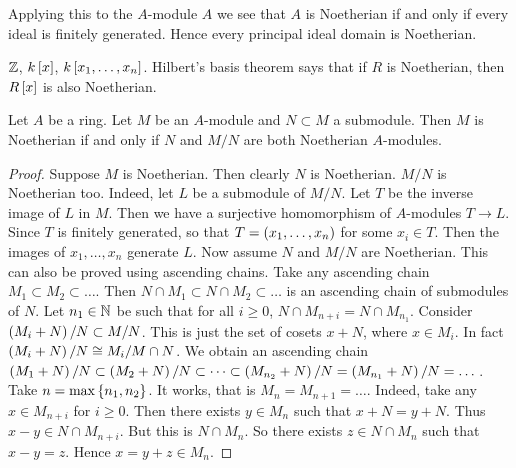 \begin{remark}
Applying this to the $ A $-module $ A $ we see that $ A $ is Noetherian if and only if every ideal is finitely generated. Hence every principal ideal domain is Noetherian.
\end{remark}

\begin{example*}
$ \Z $, $ k\sb{x} $, $ k\sb{x_1, \dots, x_n} $. Hilbert's basis theorem says that if $ R $ is Noetherian, then $ R\sb{x} $ is also Noetherian.
\end{example*}

\pagebreak

\begin{proposition}
\label{prop:10.4}
Let $ A $ be a ring. Let $ M $ be an $ A $-module and $ N \subset M $ a submodule. Then $ M $ is Noetherian if and only if $ N $ and $ M / N $ are both Noetherian $ A $-modules.
\end{proposition}

\begin{proof}
Suppose $ M $ is Noetherian. Then clearly $ N $ is Noetherian. $ M / N $ is Noetherian too. Indeed, let $ L $ be a submodule of $ M / N $. Let $ T $ be the inverse image of $ L $ in $ M $. Then we have a surjective homomorphism of $ A $-modules $ T \to L $. Since $ T $ is finitely generated, so that $ T = \rb{x_1, \dots, x_n} $ for some $ x_i \in T $. Then the images of $ x_1, \dots, x_n $ generate $ L $. Now assume $ N $ and $ M / N $ are Noetherian. This can also be proved using ascending chains. Take any ascending chain $ M_1 \subset M_2 \subset \dots $. Then $ N \cap M_1 \subset N \cap M_2 \subset \dots $ is an ascending chain of submodules of $ N $. Let $ n_1 \in \N $ be such that for all $ i \ge 0 $, $ N \cap M_{n + i} = N \cap M_{n_1} $. Consider $ \rb{M_i + N} / N \subset M / N $. This is just the set of cosets $ x + N $, where $ x \in M_i $. In fact $ \rb{M_i + N} / N \cong M_i / M \cap N $. We obtain an ascending chain $ \rb{M_1 + N} / N \subset \rb{M_2 + N} / N \subset \dots \subset \rb{M_{n_2} + N} / N = \rb{M_{n_1} + N} / N = \dots $. Take $ n = \max\cb{n_1, n_2} $. It works, that is $ M_n = M_{n + 1} = \dots $. Indeed, take any $ x \in M_{n + i} $ for $ i \ge 0 $. Then there exists $ y \in M_n $ such that $ x + N = y + N $. Thus $ x - y \in N \cap M_{n + i} $. But this is $ N \cap M_n $. So there exists $ z \in N \cap M_n $ such that $ x - y = z $. Hence $ x = y + z \in M_n $.
\end{proof}


